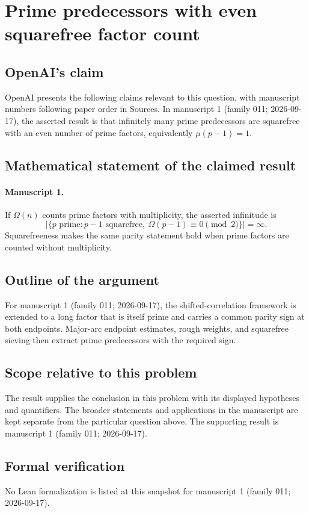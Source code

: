 \documentclass[11pt]{article}
\begin{document}
\section*{Prime predecessors with even squarefree factor count}

\subsection{OpenAI's claim}
OpenAI presents the following claims relevant to this question, with manuscript numbers following paper order in Sources. In manuscript 1 (family 011; 2026-09-17), the asserted result is that infinitely many prime predecessors are squarefree with an even number of prime factors, equivalently $\mu(p-1)=1$.

\subsection{Mathematical statement of the claimed result}
\paragraph{Manuscript 1.}
If $\Omega(n)$ counts prime factors with multiplicity, the asserted infinitude is
\[
 |\{p\text{ prime}:p-1\text{ squarefree},\ \Omega(p-1)\equiv0\pmod2\}|=\infty.
\]
Squarefreeness makes the same parity statement hold when prime factors are counted without multiplicity.

\subsection{Outline of the argument}
For manuscript 1 (family 011; 2026-09-17), the shifted-correlation framework is extended to a long factor that is itself prime and carries a common parity sign at both endpoints. Major-arc endpoint estimates, rough weights, and squarefree sieving then extract prime predecessors with the required sign.

\subsection{Scope relative to this problem}
The result supplies the conclusion in this problem with its displayed hypotheses and quantifiers. The broader statements and applications in the manuscript are kept separate from the particular question above. The supporting result is manuscript 1 (family 011; 2026-09-17).

\subsection{Formal verification}
No Lean formalization is listed at this snapshot for manuscript 1 (family 011; 2026-09-17).
\end{document}
